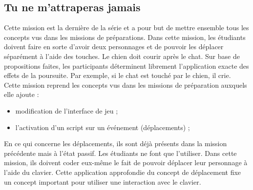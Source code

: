 \subsection{Tu ne m'attraperas jamais}
\label{chien-chat}
Cette mission est la dernière de la série et a pour but de mettre ensemble tous les concepts vus dans les missions de préparations. Dans cette mission, les étudiants doivent faire en sorte d'avoir deux personnages et de pouvoir les déplacer séparément à l'aide des touches. Le chien doit courir après le chat. Sur base de propositions faites, les participants déterminent librement l'application exacte des effets de la poursuite. Par exemple, si le chat est touché par le chien, il crie.\\

Cette mission reprend les concepts vus dans les missions de préparation auxquels elle ajoute :
\begin{itemize}
\item modification de l'interface de jeu ;
\item l'activation d'un script sur un événement (déplacements) ;
\end{itemize}

En ce qui concerne les déplacements, ils sont déjà présents dans la mission précédente mais à l'état passif. Les étudiants ne font que l'utiliser. Dans cette mission, ils doivent coder eux-même le fait de pouvoir déplacer leur personnage à l'aide du clavier. Cette application approfondie du concept de déplacement fixe un concept important pour utiliser une interaction avec le clavier.

